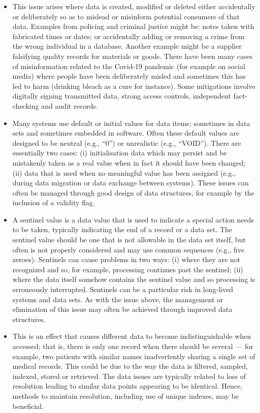 \begin{itemize}
  \item {} This issue arises where data is created, modified or deleted either accidentally or deliberately so as to mislead or misinform potential consumers of that data. Examples from policing and criminal justice might be: notes taken with fabricated times or dates; or accidentally adding or removing a crime from the wrong individual in a database. Another example might be a supplier falsifying quality records for materials or goods. There have been many cases of misinformation related to the Covid-19 pandemic (for example on social media) where people have been deliberately misled and sometimes this has led to harm (drinking bleach as a cure for instance). Some mitigations involve digitally signing transmitted data, strong access controls, independent fact-checking and audit records.

  \item {} Many systems use default or initial values for data items; sometimes in data sets and sometimes embedded in software. Often these default values are designed to be neutral (e.g., ``0'') or unrealistic (e.g., ``VOID''). There are essentially two cases: (i) initialisation data which may persist and be mistakenly taken as a real value when in fact it should have been changed; (ii) data that is used when no meaningful value has been assigned (e.g., during data migration or data exchange between systems). These issues can often be managed through good design of data structures, for example by the inclusion of a validity flag.

  \item {} A sentinel value is a data value that is used to indicate a special action needs to be taken, typically indicating the end of a record or a data set. The sentinel value should be one that is not allowable in the data set itself, but often is not properly considered and may use common sequences (e.g., five zeroes). Sentinels can cause problems in two ways: (i) where they are not recognized and so, for example, processing continues past the sentinel; (ii) where the data itself somehow contains the sentinel value and so processing is erroneously interrupted. Sentinels can be a particular risk in long-lived systems and data sets. As with the issue above, the management or elimination of this issue may often be achieved through improved data structures.

  \item {} This is an effect that causes different data to become indistinguishable when accessed; that is, there is only one record when there should be several --- for example, two patients with similar names inadvertently sharing a single set of medical records. This could be due to the way the data is filtered, sampled, indexed, stored or retrieved. The data issues are typically related to loss of resolution leading to similar data points appearing to be identical. Hence, methods to maintain resolution, including use of unique indexes, may be beneficial.


\end{itemize}
